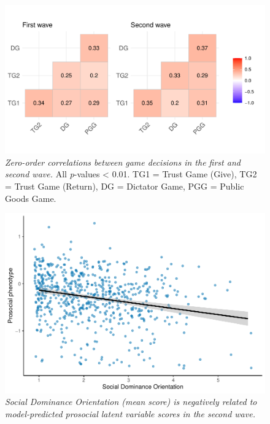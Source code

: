 \documentclass[
  man,floatsintext]{apa6}
\begin{document}
\newpage





\begin{figure}
\centering
\includegraphics{manuscript_files/figure-latex/plotCorsReduced-1.pdf}
\caption{\label{fig:plotCorsReduced}\emph{Zero-order correlations between game decisions in
the first and second wave.} All \emph{p}-values \textless{} 0.01. TG1 = Trust Game (Give),
TG2 = Trust Game (Return), DG = Dictator Game, PGG = Public Goods Game.}
\end{figure}

\newpage





\begin{figure}
\includegraphics[width=0.8\linewidth]{manuscript_files/figure-latex/semPlotReduced-1} \caption{\emph{Social Dominance Orientation (mean score) is
negatively related to model-predicted prosocial latent variable scores in the
second wave.}}\label{fig:semPlotReduced}
\end{figure}
\end{document}
